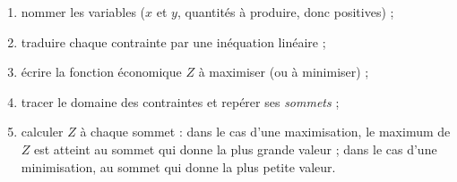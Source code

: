 \begin{methode}
\begin{enumerate}
  \item nommer les variables ($x$ et $y$, quantités à produire, donc positives) ;
  \item traduire chaque contrainte par une inéquation linéaire ;
  \item écrire la fonction économique $Z$ à maximiser (ou à minimiser) ;
  \item tracer le domaine des contraintes et repérer ses \emph{sommets} ;
  \item calculer $Z$ à chaque sommet : dans le cas d'une maximisation, le maximum de $Z$ est atteint au sommet qui donne la plus grande valeur ; dans le cas d'une minimisation, au sommet qui donne la plus petite valeur.
\end{enumerate}
\end{methode}

